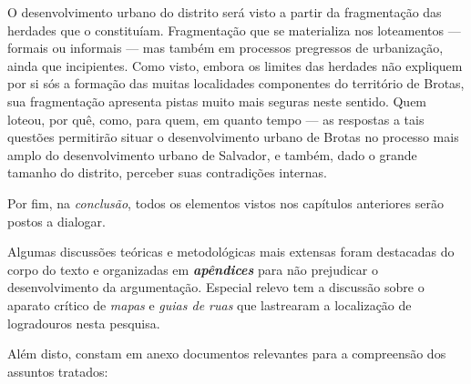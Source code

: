 O desenvolvimento urbano do distrito será visto a partir da fragmentação das herdades que o constituíam. Fragmentação que se materializa nos loteamentos --- formais ou informais --- mas também em processos pregressos de urbanização, ainda que incipientes. Como visto, embora os limites das herdades não expliquem por si sós a formação das muitas localidades componentes do território de Brotas, sua fragmentação apresenta pistas muito mais seguras neste sentido. Quem loteou, por quê, como, para quem, em quanto tempo --- as respostas a tais questões permitirão situar o desenvolvimento urbano de Brotas no processo mais amplo do desenvolvimento urbano de Salvador, e também, dado o grande tamanho do distrito, perceber suas contradições internas.

Por fim, na \textit{conclusão}, todos os elementos vistos nos capítulos anteriores serão postos a dialogar. 

Algumas discussões teóricas e metodológicas mais extensas foram destacadas do corpo do texto e organizadas em \textbf{\textit{apêndices}} para não prejudicar o desenvolvimento da argumentação. Especial relevo tem a discussão sobre o aparato crítico de \textit{mapas} e \textit{guias de ruas} que lastrearam a localização de logradouros nesta pesquisa.


Além disto, constam em anexo documentos relevantes para a compreensão dos assuntos tratados:

